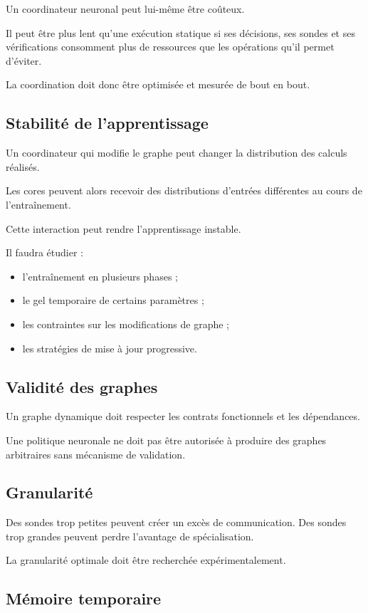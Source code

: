 \documentclass[11pt,a4paper]{article}
\begin{document}
Un coordinateur neuronal peut lui-même être coûteux.

Il peut être plus lent qu'une exécution statique si ses décisions,
ses sondes et ses vérifications consomment plus de ressources
que les opérations qu'il permet d'éviter.

La coordination doit donc être optimisée et mesurée de bout en bout.

\subsection{Stabilité de l'apprentissage}

Un coordinateur qui modifie le graphe peut changer la distribution
des calculs réalisés.

Les cores peuvent alors recevoir des distributions d'entrées
différentes au cours de l'entraînement.

Cette interaction peut rendre l'apprentissage instable.

Il faudra étudier :
\begin{itemize}
  \item l'entraînement en plusieurs phases ;
  \item le gel temporaire de certains paramètres ;
  \item les contraintes sur les modifications de graphe ;
  \item les stratégies de mise à jour progressive.
\end{itemize}

\subsection{Validité des graphes}

Un graphe dynamique doit respecter les contrats fonctionnels
et les dépendances.

Une politique neuronale ne doit pas être autorisée à produire
des graphes arbitraires sans mécanisme de validation.

\subsection{Granularité}

Des sondes trop petites peuvent créer un excès de communication.
Des sondes trop grandes peuvent perdre l'avantage de spécialisation.

La granularité optimale doit être recherchée expérimentalement.

\subsection{Mémoire temporaire}
\end{document}
